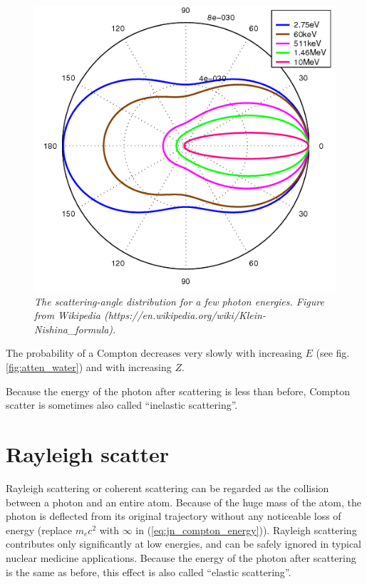 \begin{figure}[htb]
\centering
\includegraphics[bb=0 0 500 473,width=\figmedium]{figs/fig_klein_nishina.png}
\caption{\label{fig:kleinnishina} \emph{The scattering-angle
    distribution for a few photon energies. Figure from Wikipedia
    (https://en.wikipedia.org/wiki/Klein-Nishina\_formula).}}
\end{figure}


The probability of a Compton decreases very slowly with increasing $E$
(see fig. \ref{fig:atten_water}) and with increasing $Z$.

Because the energy of the photon after scattering is less than before,
Compton scatter is sometimes also called ``inelastic scattering''.

\section{Rayleigh scatter}
Rayleigh scattering or coherent scattering can be regarded as the
collision between a photon and an entire atom. Because of the huge
mass of the atom, the photon is deflected from its original trajectory
without any noticeable loss of energy (replace $m_e c^2$ with $\infty$
in (\ref{eq:jn_compton_energy})). Rayleigh scattering contributes only
significantly at low energies, and can be safely ignored in typical nuclear
medicine applications. Because the energy of the photon after
scattering is the same as before, this effect is also called ``elastic
scattering''.

